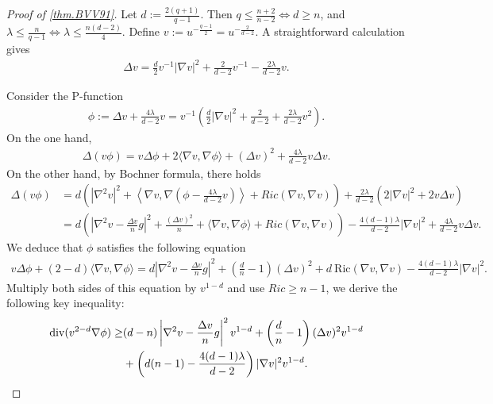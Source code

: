 \documentclass[12pt]{amsart}
\numberwithin{equation}{section}
\numberwithin{lemma}{section}
\numberwithin{proposition}{section}
\numberwithin{corollary}{section}
\numberwithin{remark}{section}
\begin{document}
\begin{proof}[Proof of \cref{thm.BVV91}]
    Let $d:=\frac{2(q+1)}{q-1}$. Then $q\leq\frac{n+2}{n-2}\Leftrightarrow d\geq n$, and $\lambda \leq \frac{n}{q-1}\Leftrightarrow \lambda\leq \frac{n(d-2)}{4}$. Define $v:=u^{-\frac{q-1}{2}}=u^{-\frac{2}{d-2}}$. A straightforward calculation gives
    \begin{align*}
        \Delta v=\frac{d}{2}v^{-1}|\nabla v|^2+\frac{2}{d-2}v^{-1}-\frac{2\lambda}{d-2}v.
    \end{align*}

    Consider the P-function 
    \begin{align*}
        \phi:=\Delta v+\frac{4\lambda}{d-2}v
    =v^{-1}\left(
    \frac{d}{2}|\nabla v|^2+\frac{2}{d-2}+\frac{2\lambda}{d-2}v^2
    \right).
    \end{align*}
    On the one hand, 
    \begin{align*}
    \Delta(v\phi)=v\Delta\phi+2\langle\nabla v,\nabla \phi\rangle+(\Delta v)^2+\frac{4\lambda}{d-2}v\Delta v.
    \end{align*}
    On the other hand, by Bochner formula, there holds
    \begin{align*}
        \Delta(v\phi)&=d
        \left(
        |\nabla^2 v|^2
        +\left\langle\nabla v,\nabla \left(\phi-\frac{4\lambda}{d-2}v\right)\right\rangle+Ric(\nabla v,\nabla v)
        \right)
        +\frac{2\lambda}{d-2}(2|\nabla v|^2+2v\Delta v)\\
        &=d
        \left(
        \left|\nabla^2 v-\frac{\Delta v}{n}g\right|^2+\frac{(\Delta v)^2}{n}
        +\langle\nabla v,\nabla \phi\rangle
        +Ric(\nabla v,\nabla v)
        \right)
        -\frac{4(d-1)\lambda}{d-2}|\nabla v|^2
        +\frac{4\lambda}{d-2}v\Delta v.
    \end{align*}    
    We deduce that $\phi$ satisfies the following equation
    \begin{align*}
        v\Delta \phi+(2-d)\langle\nabla v,\nabla \phi\rangle
        =d\left|\nabla^2 v-\frac{\Delta v}{n}g\right|^2+(\frac{d}{n}-1)(\Delta v)^2+d\ \mathrm{Ric}(\nabla v,\nabla v)-\frac{4(d-1)\lambda}{d-2}|\nabla v|^2.
    \end{align*}
Multiply both sides of this equation by $v^{1-d}$ and use $Ric\geq n-1$,  we derive the following key inequality:
    \begin{align}\label{eq.key inequality}
        \mathrm{div}(v^{2-d}\nabla \phi)
        \geq& (d-n)
        \left|\nabla^2 v-\frac{\Delta v}{n}g\right|^2 v^{1-d}
        +\left(\frac{d}{n}-1\right)(\Delta v)^2v^{1-d}\notag\\
        &+\left(
        d(n-1)-\frac{4(d-1)\lambda}{d-2}
        \right)|\nabla v|^2v^{1-d}.
    \end{align}


\end{proof}
\end{document}
